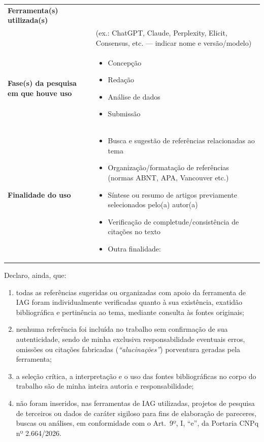\bigskip
\begin{tabular}{|p{4.5cm}|p{9.5cm}|}
\hline
\textbf{Ferramenta(s) utilizada(s)} & \underline{\hspace{9cm}} \\
& (ex.: ChatGPT, Claude, Perplexity, Elicit, Consensus, etc. --- indicar nome
e versão/modelo) \\
\hline
\textbf{Fase(s) da pesquisa em que houve uso} &
\begin{itemize}[leftmargin=*, nosep]
  \item[$\square$] Concepção
  \item[$\square$] Redação
  \item[$\square$] Análise de dados
  \item[$\square$] Submissão
\end{itemize} \\
\hline
\textbf{Finalidade do uso} &
\begin{itemize}[leftmargin=*, nosep]
  \item[$\square$] Busca e sugestão de referências relacionadas ao tema
  \item[$\square$] Organização/formatação de referências (normas ABNT, APA, Vancouver etc.)
  \item[$\square$] Síntese ou resumo de artigos previamente selecionados pelo(a) autor(a)
  \item[$\square$] Verificação de completude/consistência de citações no texto
  \item[$\square$] Outra finalidade: \underline{\hspace{5cm}}
\end{itemize} \\
\hline
\end{tabular}

\bigskip
\noindent
Declaro, ainda, que:
\begin{enumerate}[label=\alph*)]
  \item todas as referências sugeridas ou organizadas com apoio da ferramenta de IAG
  foram individualmente verificadas quanto à sua existência, exatidão bibliográfica
  e pertinência ao tema, mediante consulta às fontes originais;
  \item nenhuma referência foi incluída no trabalho sem confirmação de sua
  autenticidade, sendo de minha exclusiva responsabilidade eventuais erros,
  omissões ou citações fabricadas (\emph{``alucinações''}) porventura geradas pela
  ferramenta;
  \item a seleção crítica, a interpretação e o uso das fontes bibliográficas no
  corpo do trabalho são de minha inteira autoria e responsabilidade;
  \item não foram inseridos, nas ferramentas de IAG utilizadas, projetos de pesquisa
  de terceiros ou dados de caráter sigiloso para fins de elaboração de pareceres,
  buscas ou análises, em conformidade com o Art.~9º, I, ``e'', da Portaria CNPq
  nº 2.664/2026.
\end{enumerate}

